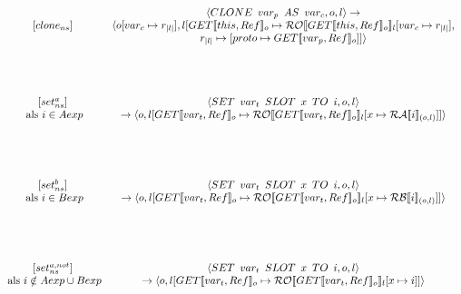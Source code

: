 \documentclass[12pt]{article}
\newcommand{\RA}{\mathcal{RA}}
\newcommand{\RB}{\mathcal{RB}}
\newcommand{\RO}{\mathcal{RO}}
\begin{document}
\[
\begin{matrix}

[clone_{ns}] &
\begin{matrix}
\langle CLONE \enspace var_p \enspace AS \enspace var_c, o, l\rangle 
\rightarrow\\
\langle o[var_c \mapsto r_{|l|}], l[GET \llbracket this, Ref \rrbracket_o \mapsto \RO \llbracket GET \llbracket this, Ref \rrbracket_o \rrbracket_l[var_c \mapsto r_{|l|}] ,\\ r_{|l|} \mapsto [ proto \mapsto GET \llbracket var_p, Ref \rrbracket_o]]\rangle
\end{matrix}\\[60pt]
\begin{matrix}
[set_{ns}^{a}]\\
\mbox{ als } i \in Aexp\\
\end{matrix} &
\begin{matrix}
\langle SET \enspace var_t \enspace SLOT \enspace x \enspace TO \enspace i, o, l \rangle\\
\rightarrow
\langle o, l[GET \llbracket var_t, Ref \rrbracket_o \mapsto \RO \llbracket GET \llbracket var_t, Ref \rrbracket_o \rrbracket_l[x \mapsto \RA 
\llbracket i \rrbracket_{(o,l)}]] \rangle
\end{matrix}\\[60pt]
\begin{matrix}
[set_{ns}^{b}]\\
\mbox{ als } i \in Bexp\\
\end{matrix} &
\begin{matrix}
\langle SET \enspace var_t \enspace SLOT \enspace x \enspace TO \enspace i, o, l \rangle\\
\rightarrow
\langle o, l[GET \llbracket var_t, Ref \rrbracket_o \mapsto \RO \llbracket GET \llbracket var_t, Ref \rrbracket_o \rrbracket_l[x \mapsto \RB 
\llbracket i \rrbracket_{(o,l)}]] \rangle
\end{matrix}\\[60pt]
\begin{matrix}
[set_{ns}^{a,not}]\\
\mbox{ als } i \notin Aexp \cup Bexp\\
\end{matrix} &
\begin{matrix}
\langle SET \enspace var_t \enspace SLOT \enspace x \enspace TO \enspace i, o, l \rangle\\
\rightarrow
\langle o, l[GET \llbracket var_t, Ref \rrbracket_o \mapsto \RO \llbracket GET \llbracket var_t, Ref \rrbracket_o \rrbracket_l[x \mapsto i ]] \rangle
\end{matrix}\\
\end{matrix}\\
\]
\end{document}

